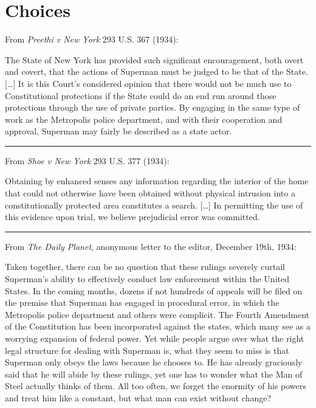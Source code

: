 \hypertarget{choices}{%
\chapter{Choices}\label{choices}}

From \emph{Preethi v New York} 293 U.S. 367 (1934):

The State of New York has provided such significant encouragement, both
overt and covert, that the actions of Superman must be judged to be that
of the State. {[}\ldots{]} It is this Court's considered opinion that
there would not be much use to Constitutional protections if the State
could do an end run around those protections through the use of private
parties. By engaging in the same type of work as the Metropolis police
department, and with their cooperation and approval, Superman may fairly
be described as a state actor.

\begin{center}\rule{0.5\linewidth}{0.5pt}\end{center}

From \emph{Shoe v New York} 293 U.S. 377 (1934):

Obtaining by enhanced senses any information regarding the interior of
the home that could not otherwise have been obtained without physical
intrusion into a constitutionally protected area constitutes a search.
{[}\ldots{]} In permitting the use of this evidence upon trial, we
believe prejudicial error was committed.

\begin{center}\rule{0.5\linewidth}{0.5pt}\end{center}

From \emph{The Daily Planet}, anonymous letter to the editor, December
19th, 1934:

Taken together, there can be no question that these rulings severely
curtail Superman's ability to effectively conduct law enforcement within
the United States. In the coming months, dozens if not hundreds of
appeals will be filed on the premise that Superman has engaged in
procedural error, in which the Metropolis police department and others
were complicit. The Fourth Amendment of the Constitution has been
incorporated against the states, which many see as a worrying expansion
of federal power. Yet while people argue over what the right legal
structure for dealing with Superman is, what they seem to miss is that
Superman only obeys the laws because he chooses to. He has already
graciously said that he will abide by these rulings, yet one has to
wonder what the Man of Steel actually thinks of them. All too often, we
forget the enormity of his powers and treat him like a constant, but
what man can exist without change?

